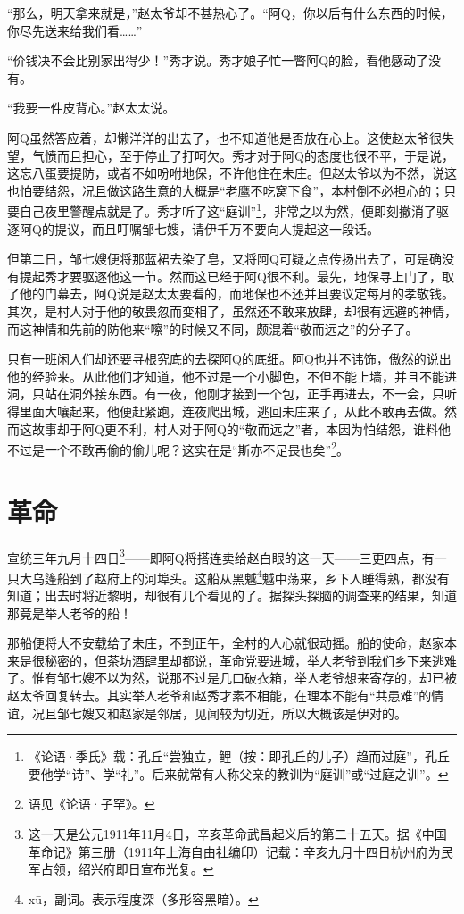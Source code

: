 \documentclass[12pt,UTF8]{ctexbook}
\begin{document}
“那么，明天拿来就是，”赵太爷却不甚热心了。“阿Q，你以后有什么东西的时候，你尽先送来给我们看……”

“价钱决不会比别家出得少！”秀才说。秀才娘子忙一瞥阿Q的脸，看他感动了没有。

“我要一件皮背心。”赵太太说。

阿Q虽然答应着，却懒洋洋的出去了，也不知道他是否放在心上。这使赵太爷很失望，气愤而且担心，至于停止了打呵欠。秀才对于阿Q的态度也很不平，于是说，这忘八蛋要提防，或者不如吩咐地保，不许他住在未庄。但赵太爷以为不然，说这也怕要结怨，况且做这路生意的大概是“老鹰不吃窝下食”，本村倒不必担心的；只要自己夜里警醒点就是了。秀才听了这“庭训”\footnote{《论语·季氏》载：孔丘“尝独立，鲤（按：即孔丘的儿子）趋而过庭”，孔丘要他学“诗”、学“礼”。后来就常有人称父亲的教训为“庭训”或“过庭之训”。}，非常之以为然，便即刻撤消了驱逐阿Q的提议，而且叮嘱邹七嫂，请伊千万不要向人提起这一段话。

但第二日，邹七嫂便将那蓝裙去染了皂，又将阿Q可疑之点传扬出去了，可是确没有提起秀才要驱逐他这一节。然而这已经于阿Q很不利。最先，地保寻上门了，取了他的门幕去，阿Q说是赵太太要看的，而地保也不还并且要议定每月的孝敬钱。其次，是村人对于他的敬畏忽而变相了，虽然还不敢来放肆，却很有远避的神情，而这神情和先前的防他来“嚓”的时候又不同，颇混着“敬而远之”的分子了。

只有一班闲人们却还要寻根究底的去探阿Q的底细。阿Q也并不讳饰，傲然的说出他的经验来。从此他们才知道，他不过是一个小脚色，不但不能上墙，并且不能进洞，只站在洞外接东西。有一夜，他刚才接到一个包，正手再进去，不一会，只听得里面大嚷起来，他便赶紧跑，连夜爬出城，逃回未庄来了，从此不敢再去做。然而这故事却于阿Q更不利，村人对于阿Q的“敬而远之”者，本因为怕结怨，谁料他不过是一个不敢再偷的偷儿呢？这实在是“斯亦不足畏也矣”\footnote{语见《论语·子罕》。}。

\chapter{革命}

宣统三年九月十四日\footnote{这一天是公元1911年11月4日，辛亥革命武昌起义后的第二十五天。据《中国革命记》第三册（1911年上海自由社编印）记载：辛亥九月十四日杭州府为民军占领，绍兴府即日宣布光复。}——即阿Q将搭连卖给赵白眼的这一天——三更四点，有一只大乌篷船到了赵府上的河埠头。这船从黑魆\footnote{x\=u，副词。表示程度深（多形容黑暗）。}魆中荡来，乡下人睡得熟，都没有知道；出去时将近黎明，却很有几个看见的了。据探头探脑的调查来的结果，知道那竟是举人老爷的船！

那船便将大不安载给了未庄，不到正午，全村的人心就很动摇。船的使命，赵家本来是很秘密的，但茶坊酒肆里却都说，革命党要进城，举人老爷到我们乡下来逃难了。惟有邹七嫂不以为然，说那不过是几口破衣箱，举人老爷想来寄存的，却已被赵太爷回复转去。其实举人老爷和赵秀才素不相能，在理本不能有“共患难”的情谊，况且邹七嫂又和赵家是邻居，见闻较为切近，所以大概该是伊对的。
\end{document}
